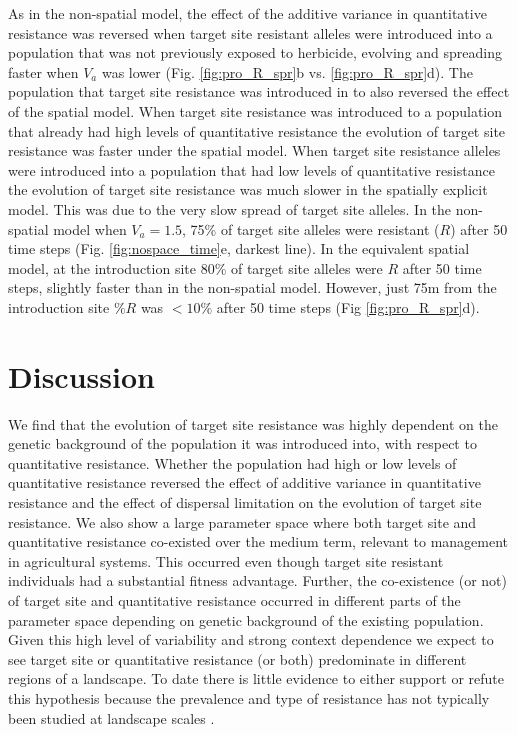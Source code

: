 \documentclass[10pt,letterpaper]{article}
\begin{document}
As in the non-spatial model, the effect of the additive variance in quantitative resistance was reversed when target site resistant alleles were introduced into a population that was not previously exposed to herbicide, evolving and spreading faster when $V_a$ was lower (Fig. \ref{fig:pro_R_spr}b vs. \ref{fig:pro_R_spr}d). The population that target site resistance was introduced in to also reversed the effect of the spatial model. When target site resistance was introduced to a population that already had high levels of quantitative resistance the evolution of target site resistance was faster under the spatial model. When target site resistance alleles were introduced into a population that had low levels of quantitative resistance the evolution of target site resistance was much slower in the spatially explicit model. This was due to the very slow spread of target site alleles. In the non-spatial model when $V_a = 1.5$, 75\% of target site alleles were resistant ($R$) after 50 time steps (Fig. \ref{fig:nospace_time}e, darkest line). In the equivalent spatial model, at the introduction site 80\% of target site alleles were $R$ after 50 time steps, slightly faster than in the non-spatial model. However, just 75m from the introduction site $\%R$ was $< 10\%$ after 50 time steps (Fig \ref{fig:pro_R_spr}d).              

\section*{Discussion}
We find that the evolution of target site resistance was highly dependent on the genetic background of the population it was introduced into, with respect to quantitative resistance. Whether the population had high or low levels of quantitative resistance reversed the effect of additive variance in  quantitative resistance and the effect of dispersal limitation on the evolution of target site resistance. We also show a large parameter space where both target site and quantitative resistance co-existed over the medium term, relevant to management in agricultural systems. This occurred even though target site resistant individuals had a substantial fitness advantage. Further, the co-existence (or not) of target site and quantitative resistance occurred in different parts of the parameter space depending on genetic background of the existing population. Given this high level of variability and strong context dependence we expect to see target site or quantitative resistance (or both) predominate in different regions of a landscape. To date there is little evidence to either support or refute this hypothesis because the prevalence and type of resistance has not typically been studied at landscape scales \cite{Dely2013}.
\end{document}
